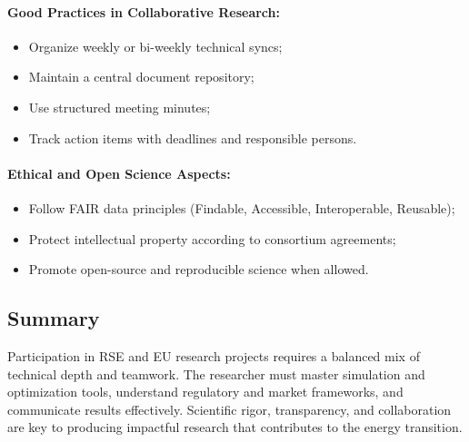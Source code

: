 \documentclass[11pt]{article}
\begin{document}
	\paragraph{Good Practices in Collaborative Research:}
	\begin{itemize}
		\item Organize weekly or bi-weekly technical syncs;
		\item Maintain a central document repository;
		\item Use structured meeting minutes;
		\item Track action items with deadlines and responsible persons.
	\end{itemize}
	
	\paragraph{Ethical and Open Science Aspects:}
	\begin{itemize}
		\item Follow FAIR data principles (Findable, Accessible, Interoperable, Reusable);
		\item Protect intellectual property according to consortium agreements;
		\item Promote open-source and reproducible science when allowed.
	\end{itemize}
	
	
	\subsection*{Summary}
	
	Participation in RSE and EU research projects requires a balanced mix of technical depth and teamwork.  
	The researcher must master simulation and optimization tools, understand regulatory and market frameworks, and communicate results effectively.  
	Scientific rigor, transparency, and collaboration are key to producing impactful research that contributes to the energy transition.
	
	
	\newpage
	
	
	
\end{document}
